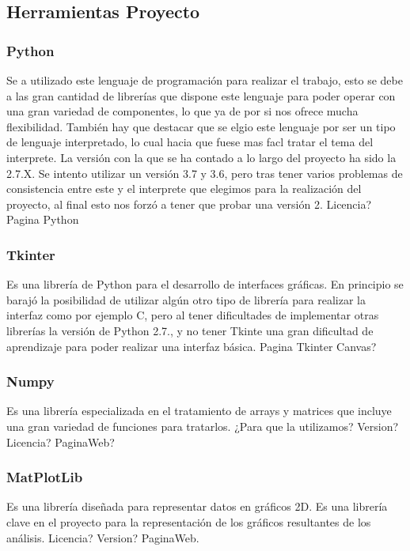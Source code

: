 \subsection{Herramientas Proyecto}

\subsubsection{Python}

Se a utilizado este lenguaje de programación para realizar el trabajo, esto se debe a las gran cantidad de librerías que dispone este lenguaje para poder operar con una gran variedad de componentes, lo que ya de por si nos ofrece mucha flexibilidad. También hay que destacar que se elgio este lenguaje por ser un tipo de lenguaje interpretado, lo cual hacia que fuese mas facl tratar el tema del interprete.
La versión con la que se ha contado a lo largo del proyecto ha sido la 2.7.X. Se intento utilizar un versión 3.7 y 3.6, pero tras tener varios problemas de consistencia entre este y el interprete que elegimos para la realización del proyecto, al final esto nos forzó a tener que probar una versión 2.
Licencia?
Pagina Python

\subsubsection{Tkinter}

Es una librería de Python para el desarrollo de interfaces gráficas. En principio se barajó la posibilidad de utilizar algún otro tipo de librería para realizar la interfaz como por ejemplo C, pero al tener dificultades de implementar otras librerías la versión de Python 2.7., y no tener Tkinte una gran dificultad de aprendizaje para poder realizar una interfaz básica.
Pagina Tkinter
Canvas?

\subsubsection{Numpy}

Es una librería especializada en el tratamiento de arrays y matrices que incluye una gran variedad de funciones para tratarlos. ¿Para que la utilizamos?
Version? Licencia? PaginaWeb?

\subsubsection{MatPlotLib}

Es una librería diseñada para representar datos en gráficos 2D. Es una librería clave en el proyecto para la representación de los gráficos resultantes de los análisis.
Licencia? Version? PaginaWeb.


